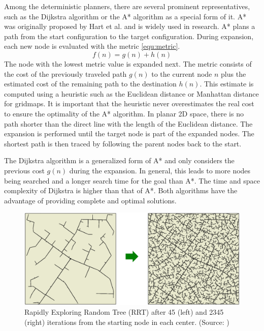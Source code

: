 Among the deterministic planners, there are several prominent representatives, such as the Dijkstra algorithm or the A* algorithm as a special form of it. A* was originally proposed by Hart et al. \cite{hart_formal_1968} and is widely used in research. A* plans a path from the start configuration to the target configuration. During expansion, each new node is evaluated with the metric \ref{equ:metric}. 
\begin{equation} \label{equ:metric}
    f(n) = g(n) + h(n)
\end{equation}
The node with the lowest metric value is expanded next. The metric consists of the cost of the previously traveled path \(g(n)\) to the current node \(n\) plus the estimated cost of the remaining path to the destination \(h(n)\). This estimate is computed using a heuristic such as the Euclidean distance or Manhattan distance for gridmaps. It is important that the heuristic never overestimates the real cost to ensure the optimality of the A* algorithm. In planar 2D space, there is no path shorter than the direct line with the length of the Euclidean distance. The expansion is performed until the target node is part of the expanded nodes. The shortest path is then traced by following the parent nodes back to the start.

The Dijkstra algorithm \cite{dijkstra_note_1959} is a generalized form of A* and only considers the previous cost \(g(n)\) during the expansion. In general, this leads to more nodes being searched and a longer search time for the goal than A*. The time and space complexity of Dijkstra is higher than that of A*. Both algorithms have the advantage of providing complete and optimal solutions.

\begin{figure}[h]
    \centering
    \includegraphics[width=1\textwidth]{figures/20_state_of_the_art/rrt.png}
    \caption[The RRT algorithm]{Rapidly Exploring Random Tree (RRT) after 45 (left) and 2345 (right) iterations from the starting node in each center. (Source: \cite{burgard_introduction_2021})}
    \label{fig:rrt}
\end{figure}

